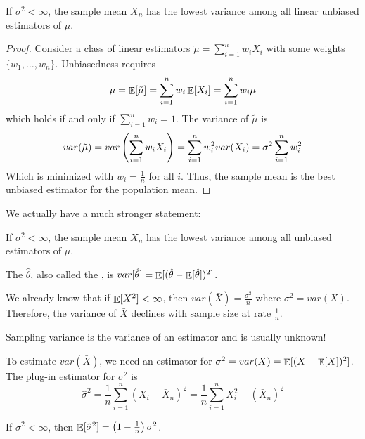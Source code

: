 \documentclass[10pt]{article}
\begin{document}
\begin{theorem}
	If $\sigma^2 < \infty$, the sample mean $\bar{X}_n$ has the lowest variance among all linear unbiased estimators of $\mu$.
\end{theorem}
\begin{proof}
	Consider a class of linear estimators $\tilde{\mu} = \sum_{i=1}^n w_iX_i$ with some weights $\{w_1,\dots,w_n\}$. Unbiasedness requires
	\[
	\mu = \mathop{\mathbb{E}}[\tilde{\mu}] = \sum_{i=1}^n w_i \mathop{\mathbb{E}}[X_i] = \sum_{i=1}^n w_i \mu
	\]
	which holds if and only if $\sum_{i=1}^n w_i = 1$. The variance of $\tilde{\mu}$ is 
	\[
	var(\tilde{\mu}) = var \left( \sum_{i=1}^n w_i X_i \right) = \sum_{i=1}^n w_i^2 var(X_i) = \sigma^2 \sum_{i=1}^n w_i^2
	\]
	Which is minimized with $w_i = \frac{1}{n}$ for all $i$. Thus, the sample mean is the best unbiased estimator for the population mean.
\end{proof}

We actually have a much stronger statement:

\begin{theorem}
	If $\sigma^2 < \infty$, the sample mean $\bar{X}_n$ has the lowest variance among all unbiased estimators of $\mu$.
\end{theorem}


\begin{definition}
	The  $\hat{\theta}$, also called the , is $var[\hat{\theta}] = \mathop{\mathbb{E}}[ (\hat{\theta} - \mathop{\mathbb{E}}[\hat{\theta}])^2]$.
\end{definition}

We already know that if $\mathop{\mathbb{E}}[X^2] < \infty$, then $var(\bar{X}) = \frac{\sigma^2}{n}$ where $\sigma^2 = var(X)$. Therefore, the variance of $\bar{X}$ declines with sample size at rate $\frac{1}{n}$. 

\begin{remark}
	Sampling variance is the variance of an estimator and is usually unknown!
\end{remark}

To estimate $var(\bar{X})$, we need an estimator for $\sigma^2 = var(X) = \mathop{\mathbb{E}}[ (X - \mathop{\mathbb{E}}[X])^2]$. The plug-in estimator for $\sigma^2$ is 
\[
\hat{\sigma}^2 = \frac{1}{n} \sum_{i=1}^n (X_i - \bar{X}_n)^2 = \frac{1}{n} \sum_{i=1}^n X_i^2 - (\bar{X}_n)^2
\]

\begin{theorem}
	If $\sigma^2 < \infty$, then $\mathop{\mathbb{E}}[\hat{\sigma}^2] = \left( 1 - \frac{1}{n}\right) \sigma^2$.
\end{theorem}
\end{document}
